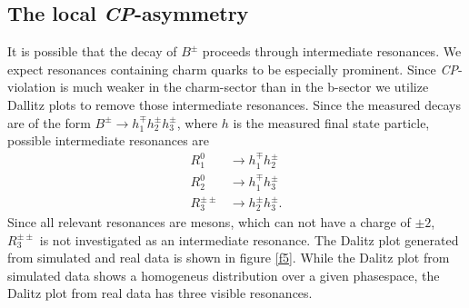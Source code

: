 
\subsection{The local \textit{CP}-asymmetry}
It is possible that the decay of $B^\pm$ proceeds through intermediate resonances. We expect resonances containing charm quarks 
to be especially prominent. Since \textit{CP}-violation is much weaker in the charm-sector than in the b-sector we utilize 
Dallitz plots to remove those intermediate resonances. Since the measured decays are of the form $B^\pm \rightarrow h_1^\mp h_2^\pm h_3^\pm$,
where $h$ is the measured final state particle, possible intermediate resonances are 
\begin{align*}
  R_1^0 &\rightarrow h_1^\mp h_2^\pm \\
  R_2^0 &\rightarrow h_1^\mp h_3^\pm \\
  R_3^{\pm \pm} &\rightarrow h_2^\pm h_3^\pm .
\end{align*}
Since all relevant resonances are mesons, which can not have a charge of $\pm 2$, $R_3^{\pm \pm}$ is not investigated as an intermediate resonance.
The Dalitz plot generated from simulated and real data is shown in figure \ref{f5}.
While the Dalitz plot from simulated data shows a homogeneus distribution over a given phasespace, the Dalitz plot from real data has three visible 
resonances. 

